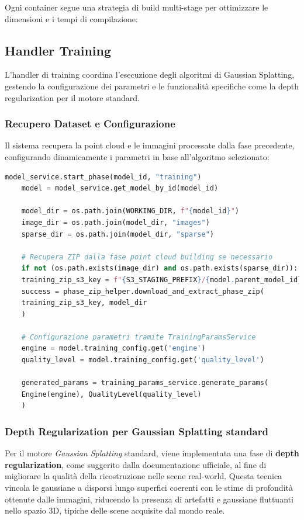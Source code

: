 Ogni container segue una strategia di build multi-stage per ottimizzare le dimensioni e i tempi di compilazione:

\subsection{Handler Training}

L'handler di training coordina l'esecuzione degli algoritmi di Gaussian Splatting, gestendo la configurazione dei parametri e le funzionalità specifiche come la depth regularization per il motore standard.

\subsubsection{Recupero Dataset e Configurazione}

Il sistema recupera la point cloud e le immagini processate dalla fase precedente, configurando dinamicamente i parametri in base all'algoritmo selezionato:

\begin{lstlisting}[language=python, caption=Inizializzazione e configurazione training]
	model_service.start_phase(model_id, "training")
	model = model_service.get_model_by_id(model_id)
	
	model_dir = os.path.join(WORKING_DIR, f"{model_id}")
	image_dir = os.path.join(model_dir, "images")
	sparse_dir = os.path.join(model_dir, "sparse")
	
	# Recupera ZIP dalla fase point cloud building se necessario
	if not (os.path.exists(image_dir) and os.path.exists(sparse_dir)):
	training_zip_s3_key = f"{S3_STAGING_PREFIX}/{model.parent_model_id}/{TRAINING_PHASE_ZIP_NAME}"
	success = phase_zip_helper.download_and_extract_phase_zip(
	training_zip_s3_key, model_dir
	)
	
	# Configurazione parametri tramite TrainingParamsService
	engine = model.training_config.get('engine')
	quality_level = model.training_config.get('quality_level')
	
	generated_params = training_params_service.generate_params(
	Engine(engine), QualityLevel(quality_level)
	)
\end{lstlisting}

\subsubsection{Depth Regularization per Gaussian Splatting standard}

Per il motore \textit{Gaussian Splatting} standard, viene implementata una fase di \textbf{depth regularization}, come suggerito dalla documentazione ufficiale, al fine di migliorare la qualità della ricostruzione nelle scene real-world.
Questa tecnica vincola le gaussiane a disporsi lungo superfici coerenti con le stime di profondità ottenute dalle immagini, riducendo la presenza di artefatti e gaussiane fluttuanti nello spazio 3D, tipiche delle scene acquisite dal mondo reale.


